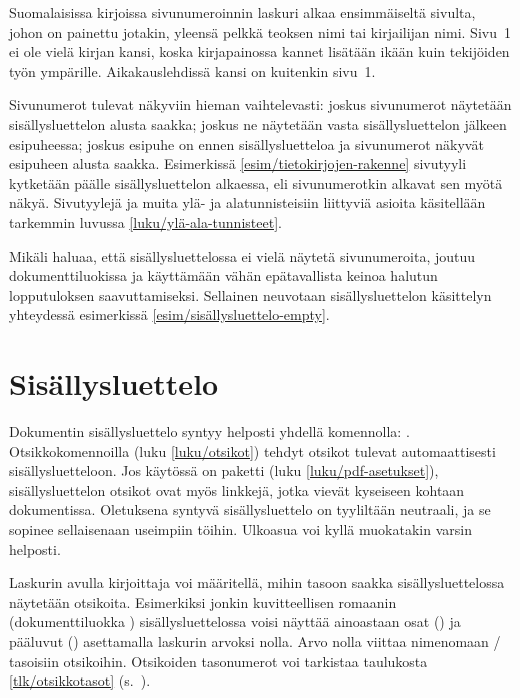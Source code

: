 Suomalaisissa kirjoissa sivunumeroinnin laskuri alkaa ensimmäiseltä
sivulta, johon on painettu jotakin, yleensä pelkkä teoksen nimi tai
kirjailijan nimi. Sivu~1 ei ole vielä kirjan kansi, koska kirjapainossa
kannet lisätään ikään kuin tekijöiden työn ympärille. Aikakauslehdissä
kansi on kuitenkin sivu~1.

Sivunumerot tulevat näkyviin hieman vaihtelevasti: joskus sivunumerot
näytetään sisällysluettelon alusta saakka; joskus ne näytetään vasta
sisällysluettelon jälkeen esipuheessa; joskus esipuhe on ennen
sisällysluetteloa ja sivunumerot näkyvät esipuheen alusta saakka.
Esimerkissä \ref{esim/tietokirjojen-rakenne} sivutyyli 
kytketään päälle sisällysluettelon alkaessa, eli sivunumerotkin alkavat
sen myötä näkyä. Sivutyylejä ja muita ylä- ja alatunnisteisiin liittyviä
asioita käsitellään tarkemmin luvussa \ref{luku/ylä-ala-tunnisteet}.

Mikäli haluaa, että sisällysluettelossa ei vielä näytetä sivunumeroita,
joutuu dokumenttiluokissa  ja  käyttämään
vähän epätavallista keinoa halutun lopputuloksen saavuttamiseksi.
Sellainen neuvotaan sisällysluettelon käsittelyn yhteydessä esimerkissä
\ref{esim/sisällysluettelo-empty}.

\section{Sisällysluettelo}
\label{luku/sisällysluettelo}

Dokumentin sisällysluettelo syntyy helposti yhdellä komennolla:
. Otsikkokomennoilla (luku \ref{luku/otsikot})
tehdyt otsikot tulevat automaattisesti sisällysluetteloon. Jos käytössä
on paketti  (luku \ref{luku/pdf-asetukset}),
sisällysluettelon otsikot ovat myös linkkejä, jotka vievät kyseiseen
kohtaan dokumentissa. Oletuksena syntyvä sisällysluettelo on tyyliltään
neutraali, ja se sopinee sellaisenaan useimpiin töihin. Ulkoasua voi
kyllä muokatakin varsin helposti.

\begin{koodilohkosis}
\tableofcontents
\end{koodilohkosis}

\noindent
Laskurin  avulla kirjoittaja voi määritellä, mihin
tasoon saakka sisällysluettelossa näytetään otsikoita. Esimerkiksi
jonkin kuvitteellisen romaanin (dokumenttiluokka )
sisällysluettelossa voisi näyttää ainoastaan osat () ja
pääluvut () asettamalla laskurin arvoksi nolla. Arvo
nolla viittaa nimenomaan \-/ tasoisiin otsikoihin.
Otsikoiden tasonumerot voi tarkistaa taulukosta \ref{tlk/otsikkotasot}
(s.~\pageref{tlk/otsikkotasot}).

